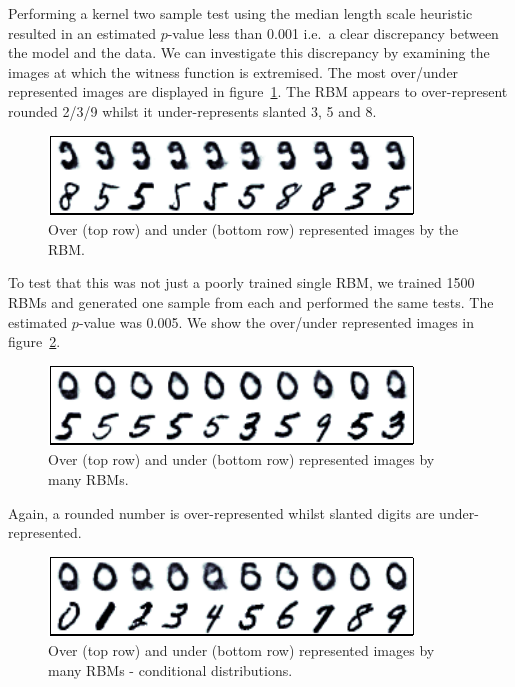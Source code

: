 \documentclass{article}
\def\ie{i.e.\ }
\begin{document}
Performing a kernel two sample test using the median length scale heuristic resulted in an estimated $p$-value less than 0.001 \ie a clear discrepancy between the model and the data.
We can investigate this discrepancy by examining the images at which the witness function is extremised.
The most over/under represented images are displayed in figure~\ref{fig:rbm_over_under}.
The RBM appears to over-represent rounded 2/3/9 whilst it under-represents slanted 3, 5 and 8.

\begin{figure}[ht]
\centering
\includegraphics[width=0.98\columnwidth]{figures/rbm_over_under}
\caption{
Over (top row) and under (bottom row) represented images by the RBM.
}
\label{fig:rbm_over_under}
\end{figure}

To test that this was not just a poorly trained single RBM, we trained 1500 RBMs and generated one sample from each and performed the same tests.
The estimated $p$-value was 0.005.
We show the over/under represented images in figure~\ref{fig:many_rbm_over_under}.

\begin{figure}[ht]
\centering
\includegraphics[width=0.98\columnwidth]{figures/many_rbm_over_under}
\caption{
Over (top row) and under (bottom row) represented images by many RBMs.
}
\label{fig:many_rbm_over_under}
\end{figure}

Again, a rounded number is over-represented whilst slanted digits are under-represented.

\begin{figure}[ht]
\centering
\includegraphics[width=0.98\columnwidth]{figures/many_rbm_over_under_digit}
\caption{
Over (top row) and under (bottom row) represented images by many RBMs - conditional distributions.
}
\label{fig:many_rbm_over_under_digit}
\end{figure}
\end{document}
